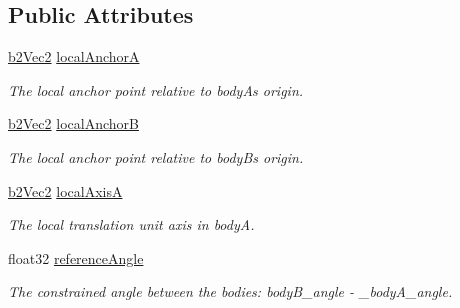 \subsection*{Public Attributes}
\begin{DoxyCompactItemize}
\item 
\mbox{\label{structb2PrismaticJointDef_abb51df8daff7a55f47adc83e4f7fa5b9}} 
\mbox{\hyperlink{structb2Vec2}{b2\+Vec2}} \mbox{\hyperlink{structb2PrismaticJointDef_abb51df8daff7a55f47adc83e4f7fa5b9}{local\+AnchorA}}
\begin{DoxyCompactList}\small\item\em The local anchor point relative to bodyA\textquotesingle{}s origin. \end{DoxyCompactList}\item 
\mbox{\label{structb2PrismaticJointDef_a5acc1f2f14d1b659fc9d804ab1baf4a3}} 
\mbox{\hyperlink{structb2Vec2}{b2\+Vec2}} \mbox{\hyperlink{structb2PrismaticJointDef_a5acc1f2f14d1b659fc9d804ab1baf4a3}{local\+AnchorB}}
\begin{DoxyCompactList}\small\item\em The local anchor point relative to bodyB\textquotesingle{}s origin. \end{DoxyCompactList}\item 
\mbox{\label{structb2PrismaticJointDef_af36fdbcedca5a392a2649cd235c42676}} 
\mbox{\hyperlink{structb2Vec2}{b2\+Vec2}} \mbox{\hyperlink{structb2PrismaticJointDef_af36fdbcedca5a392a2649cd235c42676}{local\+AxisA}}
\begin{DoxyCompactList}\small\item\em The local translation unit axis in bodyA. \end{DoxyCompactList}\item 
\mbox{\label{structb2PrismaticJointDef_aa84b43d08e6e11b4daa0c86f46094463}} 
float32 \mbox{\hyperlink{structb2PrismaticJointDef_aa84b43d08e6e11b4daa0c86f46094463}{reference\+Angle}}
\begin{DoxyCompactList}\small\item\em The constrained angle between the bodies\+: body\+B\+\_\+angle -\/ _body\+A\+\_\+angle. \end{DoxyCompactList}\item
\mbox{\label{structb2PrismaticJointDef_aa61a03b68caac62a5cf66354f6756eae}} 

\end{DoxyCompactItemize}
